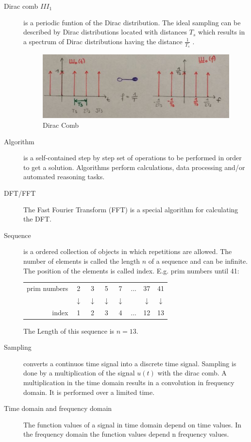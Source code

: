 \begin{description}
\begin{enumerate}
\begin{figure}[!h]
				\end{figure}				
		\end{enumerate}
	\item[Dirac comb ${III}_1$] is a periodic funtion of the Dirac distribution. The ideal sampling can be described by Dirac distributions located with distances $T_s$ which results in a spectrum of Dirac distributions having the distance $\frac{1}{T_s}$ .
		\begin{figure}[!h]
			\centering
			\includegraphics[width=0.7\linewidth]{images_LA/diraccomb}
			\caption{Dirac Comb}
			\label{fig:diraccomb}
		\end{figure}
	\item[Algorithm] is a self-contained step by step set of operations to be performed in order to get a solution. Algorithms perform calculations, data processing and/or automated reasoning tasks.
	\item[DFT/FFT] The Fast Fourier Transform (FFT) is a special algorithm for calculating the DFT.
	\item[Sequence] is a ordered collection of objects in which repetitions are allowed. The number of elements is called the length $n$ of a sequence and can be infinite. The position of the elements is called index.
	E.g. prim numbers until 41: 
	
	\begin{tabular}{rccccccc} 
		prim numbers &2 & 3 & 5 & 7 & ... & 37 & 41 \\  
		& $\downarrow$ & $\downarrow$ & $\downarrow$ & $\downarrow$ &  & $\downarrow$ &   $\downarrow$ \\ 
		index & 1 & 2 & 3 & 4 & ...   & 12 & 13 \\ 
	\end{tabular} 
	
	The Length of this sequence is $n=13$.
	
	\item[Sampling] converts a continuos time signal into a discrete time signal. Sampling is done by a multiplication of the signal $u(t)$ with the dirac comb. A multiplication in the time domain results in a convolution in frequency domain. It is performed over a limited time.
	\item[Time domain and frequency domain] The function values of a signal in time domain depend on time values. In the frequency domain the function values depend n frequency values.
	

\end{description}
